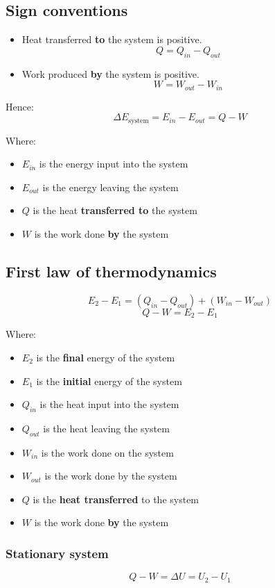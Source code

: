 \documentclass[11pt]{article}
\begin{document}
\subsection{Sign conventions}
\label{sec:org70c7491}
\begin{itemize}
\item Heat transferred \textbf{to} the system is positive.
\[Q = Q_{in} - Q_{out}\]

\item Work produced \textbf{by} the system is positive.
\[W = W_{out} - W_{in}\]
\end{itemize}

Hence:
\[\Delta E_{\text{system}} = E_{in} - E_{out} = Q - W\]

Where:
\begin{itemize}
\item \(E_{in}\) is the energy input into the system
\item \(E_{out}\) is the energy leaving the system
\item \(Q\) is the heat \textbf{transferred to} the system
\item \(W\) is the work done \textbf{by} the system
\end{itemize}

\subsection{First law of thermodynamics}
\label{sec:org3f4027f}
\[E_2 - E_1 = (Q_{in} - Q_{out}) + (W_{in} - W_{out})\]
\[Q - W = E_2 - E_1\]

Where:
\begin{itemize}
\item \(E_2\) is the \textbf{final} energy of the system
\item \(E_1\) is the \textbf{initial} energy of the system
\item \(Q_{in}\) is the heat input into the system
\item \(Q_{out}\) is the heat leaving the system
\item \(W_{in}\) is the work done on the system
\item \(W_{out}\) is the work done by the system
\item \(Q\) is the \textbf{heat transferred} to the system
\item \(W\) is the work done \textbf{by} the system
\end{itemize}

\subsubsection{Stationary system}
\label{sec:org42c287f}
\[Q - W = \Delta U = U_2 - U_1\]
\end{document}
